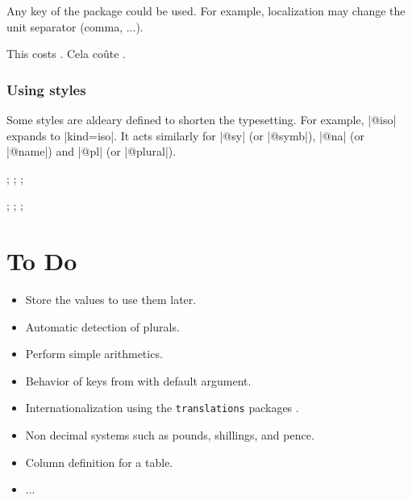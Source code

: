 \documentclass[12pt,add-index]{cnltx-doc}
\begin{document}
Any key of the  package could be used. 
For example, localization may change the unit separator (comma, ...).

\begin{example}
    This costs .
    { Cela co\^ute .}
\end{example}

\subsubsection{Using styles}

Some styles are aldeary defined to shorten the typesetting. 
For example, \verbcode|@iso| expands to \verbcode|kind=iso|.
It
acts similarly for \verbcode|@sy| (or \verbcode|@symb|), \verbcode|@na| (or \verbcode|@name|) and \verbcode|@pl|
(or \verbcode|@plural|).

\begin{example}
    ; ; ; 

     ;  ;  ; 
\end{example}







\section{To Do}

\begin{itemize}
    \item Store the values to use them later. 
    \item Automatic detection of plurals.
    \item Perform simple arithmetics.
    \item Behavior of  keys from  with default argument.
    \item Internationalization using the \texttt{translations} packages \cite{translations}.
    \item Non decimal systems such as pounds, shillings, and pence.
    \item Column definition for a table.
    \item ...
\end{itemize}


\printbibliography
\end{document}
